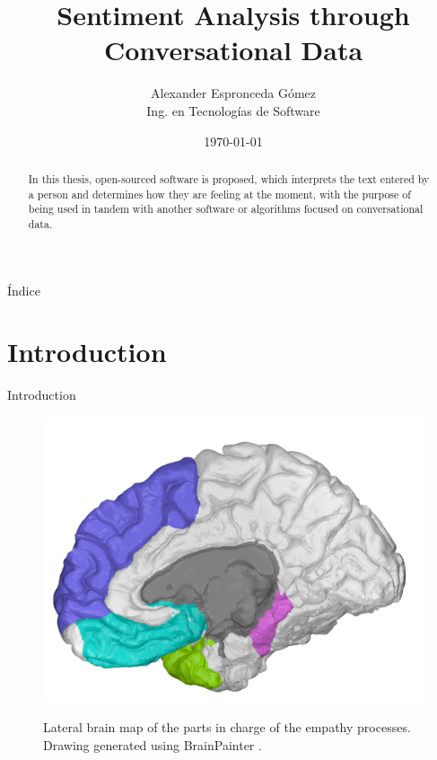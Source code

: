 \documentclass[11pt]{beamer}
\begin{document}
 
\title[Defensa de Tesis  \hspace{35mm} \insertframenumber/\inserttotalframenumber]{Sentiment Analysis through Conversational Data}
\author{Alexander Espronceda Gómez \\ Ing. en Tecnologías de Software}
\date{\today}


\frame{\titlepage}

\begin{frame}{Índice}
\transdissolve
\begin{center}
\begin{multicols}{2}
  \footnotesize{\tableofcontents}	
\end{multicols}
\end{center}
\end{frame}

\begin{frame}
  \begin{abstract}
    In this thesis, open-sourced software is proposed, which interprets the text entered by a person and determines how they are feeling at the moment, with the purpose of being used in tandem with another software or algorithms focused on conversational data.
  \end{abstract}
\end{frame}

\section{Introduction}

\begin{frame}{Introduction}
  \begin{figure}[!h]
	\centering
	\includegraphics[scale=0.15]{BrainMap}
	\label{fig:brainmap}
	\caption{Lateral brain map of the parts in charge of the empathy processes. Drawing generated using BrainPainter \citep{img1}.}
	\end{figure}
\end{frame}
\end{document}

